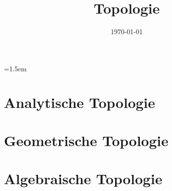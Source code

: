 \documentclass{mycourse}
\title{Topologie}
\date{\today}
\begin{document}
\emergencystretch=1.5em

\maketitle

\tableofcontents


\part{Analytische Topologie}





\part{Geometrische Topologie}



\part{Algebraische Topologie}



\printindex[lectures]
\end{document}
